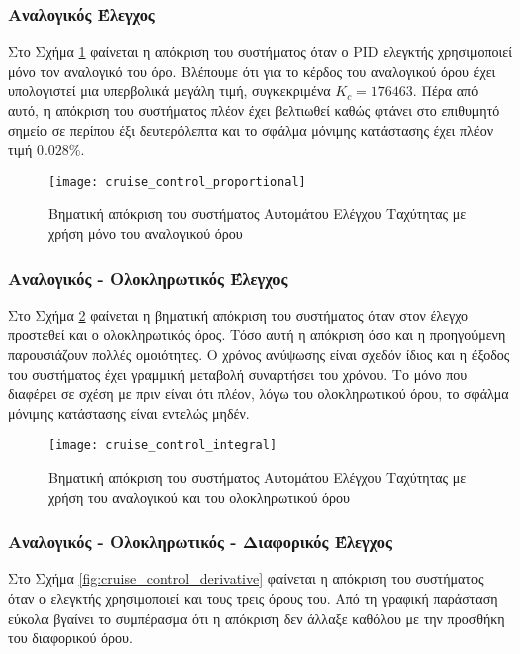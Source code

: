 \subsubsection{Αναλογικός Έλεγχος}

Στο Σχήμα \ref{fig:cruise_control_proportional} φαίνεται η απόκριση του συστήματος όταν ο PID ελεγκτής χρησιμοποιεί μόνο τον αναλογικό του όρο. Βλέπουμε ότι για το κέρδος του αναλογικού όρου έχει υπολογιστεί μια υπερβολικά μεγάλη τιμή, συγκεκριμένα $K_c = 176463$. Πέρα από αυτό, η απόκριση του συστήματος πλέον έχει βελτιωθεί καθώς φτάνει στο επιθυμητό σημείο σε περίπου έξι δευτερόλεπτα και το σφάλμα μόνιμης κατάστασης έχει πλέον τιμή $0.028\%$.

\begin{figure}[h]
  \centering
  \texttt{[image: cruise\_control\_proportional]}
  \caption{Βηματική απόκριση του συστήματος Αυτομάτου Ελέγχου Ταχύτητας με χρήση μόνο του αναλογικού όρου}
  \label{fig:cruise_control_proportional}
\end{figure}

\subsubsection{Αναλογικός - Ολοκληρωτικός Έλεγχος}

Στο Σχήμα \ref{fig:cruise_control_integral} φαίνεται η βηματική απόκριση του συστήματος όταν στον έλεγχο προστεθεί και ο ολοκληρωτικός όρος. Τόσο αυτή η απόκριση όσο και η προηγούμενη παρουσιάζουν πολλές ομοιότητες. Ο χρόνος ανύψωσης είναι σχεδόν ίδιος και η έξοδος του συστήματος έχει γραμμική μεταβολή συναρτήσει του χρόνου. Το μόνο που διαφέρει σε σχέση με πριν είναι ότι πλέον, λόγω του ολοκληρωτικού όρου, το σφάλμα μόνιμης κατάστασης είναι εντελώς μηδέν.

\begin{figure}[h]
  \centering
  \texttt{[image: cruise\_control\_integral]}
  \caption{Βηματική απόκριση του συστήματος Αυτομάτου Ελέγχου Ταχύτητας με χρήση του αναλογικού και του ολοκληρωτικού όρου}
  \label{fig:cruise_control_integral}
\end{figure}

\subsubsection{Αναλογικός - Ολοκληρωτικός - Διαφορικός Έλεγχος}

Στο Σχήμα \ref{fig:cruise_control_derivative} φαίνεται η απόκριση του συστήματος όταν ο ελεγκτής χρησιμοποιεί και τους τρεις όρους του. Από τη γραφική παράσταση εύκολα βγαίνει το συμπέρασμα ότι η απόκριση δεν άλλαξε καθόλου με την προσθήκη του διαφορικού όρου.

